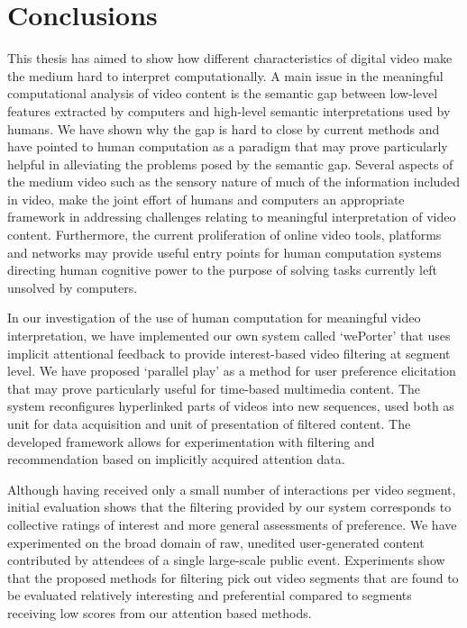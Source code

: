 \chapter{Conclusions}
\label{ch:conclusions}
 
This thesis has aimed to show how different characteristics of digital video make the medium hard to interpret computationally. A main issue in the meaningful computational analysis of video content is the semantic gap between low-level features extracted by computers and high-level semantic interpretations used by humans. We have shown why the gap is hard to close by current methods and have pointed to human computation as a paradigm that may prove particularly helpful in alleviating the problems posed by the semantic gap.
Several aspects of the medium video such as the sensory nature of much of the information included in video, make the joint effort of humans and computers an appropriate framework in addressing challenges relating to meaningful interpretation of video content. Furthermore, the current proliferation of online video tools, platforms and networks may provide useful entry points for human computation systems directing human cognitive power to the purpose of solving tasks currently left unsolved by computers.

In our investigation of the use of human computation for meaningful video interpretation, we have implemented our own system called `wePorter' that uses implicit attentional feedback to provide interest-based video filtering at segment level. We have proposed `parallel play' as a method for user preference elicitation that may prove  particularly useful for time-based multimedia content. The system reconfigures hyperlinked parts of videos into new sequences, used both as unit for data acquisition and unit of presentation of filtered content. The developed framework allows for experimentation with filtering and recommendation based on implicitly acquired attention data.

Although having received only a small number of interactions per video segment, initial evaluation shows that the filtering provided by our system corresponds to collective ratings of interest and more general assessments of preference. We have experimented on the broad domain of raw, unedited user-generated content contributed by attendees of a single large-scale public event. Experiments show that the proposed methods for filtering pick out video segments that are found to be evaluated relatively interesting and preferential compared to segments receiving low scores from our attention based methods.